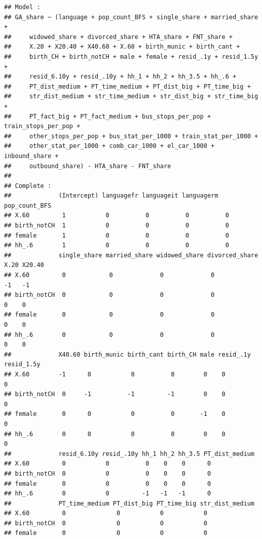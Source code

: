 \documentclass[
]{article}
\begin{document}
\begin{verbatim}
## Model :
## GA_share ~ (language + pop_count_BFS + single_share + married_share + 
##     widowed_share + divorced_share + HTA_share + FNT_share + 
##     X.20 + X20.40 + X40.60 + X.60 + birth_munic + birth_cant + 
##     birth_CH + birth_notCH + male + female + resid_.1y + resid_1.5y + 
##     resid_6.10y + resid_.10y + hh_1 + hh_2 + hh_3.5 + hh_.6 + 
##     PT_dist_medium + PT_time_medium + PT_dist_big + PT_time_big + 
##     str_dist_medium + str_time_medium + str_dist_big + str_time_big + 
##     PT_fact_big + PT_fact_medium + bus_stops_per_pop + train_stops_per_pop + 
##     other_stops_per_pop + bus_stat_per_1000 + train_stat_per_1000 + 
##     other_stat_per_1000 + comb_car_1000 + el_car_1000 + inbound_share + 
##     outbound_share) - HTA_share - FNT_share
## 
## Complete :
##             (Intercept) languagefr languageit languagerm pop_count_BFS
## X.60         1           0          0          0          0           
## birth_notCH  1           0          0          0          0           
## female       1           0          0          0          0           
## hh_.6        1           0          0          0          0           
##             single_share married_share widowed_share divorced_share X.20 X20.40
## X.60         0            0             0             0             -1   -1    
## birth_notCH  0            0             0             0              0    0    
## female       0            0             0             0              0    0    
## hh_.6        0            0             0             0              0    0    
##             X40.60 birth_munic birth_cant birth_CH male resid_.1y resid_1.5y
## X.60        -1      0           0          0        0    0         0        
## birth_notCH  0     -1          -1         -1        0    0         0        
## female       0      0           0          0       -1    0         0        
## hh_.6        0      0           0          0        0    0         0        
##             resid_6.10y resid_.10y hh_1 hh_2 hh_3.5 PT_dist_medium
## X.60         0           0          0    0    0      0            
## birth_notCH  0           0          0    0    0      0            
## female       0           0          0    0    0      0            
## hh_.6        0           0         -1   -1   -1      0            
##             PT_time_medium PT_dist_big PT_time_big str_dist_medium
## X.60         0              0           0           0             
## birth_notCH  0              0           0           0             
## female       0              0           0           0             

\end{verbatim}
\end{document}
